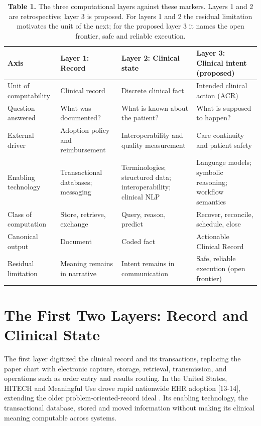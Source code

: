 \begin{table}[t]
\centering
\caption{\textbf{Table 1.} The three computational layers against these markers. Layers 1 and 2 are retrospective; layer 3 is proposed. For layers 1 and 2 the residual limitation motivates the unit of the next; for the proposed layer 3 it names the open frontier, safe and reliable execution.}
\small\setlength{\tabcolsep}{4pt}%
\setlength{\tabcolsep}{4pt}
\begin{tabularx}{\textwidth}{>{\hsize=0.653\hsize\raggedright\arraybackslash}X >{\hsize=0.881\hsize\raggedright\arraybackslash}X >{\hsize=1.279\hsize\raggedright\arraybackslash}X >{\hsize=1.187\hsize\raggedright\arraybackslash}X}
\toprule
Axis & Layer 1: Record & Layer 2: Clinical state & Layer 3: Clinical intent (proposed) \\
\midrule
Unit of computability & Clinical record & Discrete clinical fact & Intended clinical action (ACR) \\
Question answered & What was documented? & What is known about the patient? & What is supposed to happen? \\
External driver & Adoption policy and reimbursement & Interoperability and quality measurement & Care continuity and patient safety \\
Enabling technology & Transactional databases; messaging & Terminologies; structured data; interoperability; clinical NLP & Language models; symbolic reasoning; workflow semantics \\
Class of computation & Store, retrieve, exchange & Query, reason, predict & Recover, reconcile, schedule, close \\
Canonical output & Document & Coded fact & Actionable Clinical Record \\
Residual limitation & Meaning remains in narrative & Intent remains in communication & Safe, reliable execution (open frontier) \\
\bottomrule
\end{tabularx}
\end{table}

\section{The First Two Layers: Record and Clinical State}\label{the-first-two-layers-record-and-clinical-state}

The first layer digitized the clinical record and its transactions, replacing the paper chart with electronic capture, storage, retrieval, transmission, and operations such as order entry and results routing. In the United States, HITECH and Meaningful Use drove rapid nationwide EHR adoption {[}13-14{]}, extending the older problem-oriented-record ideal \cite{ref15}. Its enabling technology, the transactional database, stored and moved information without making its clinical meaning computable across systems.

